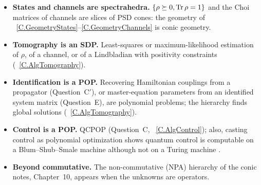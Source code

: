 \documentclass[handoutsbeamer.tex]{subfiles}
\begin{document}
\begin{frame}
\mop{\small}
\begin{itemize}\setlength\itemsep{0.4em}
    \item \textbf{States and channels are spectrahedra.} $\{\rho\succeq0,\operatorname{Tr}\rho=1\}$ and the Choi matrices of channels are slices of PSD cones: the geometry of \Chaps~\ref{C.GeometryStates}--\ref{C.GeometryChannels} is conic geometry.
    \item \textbf{Tomography is an SDP.} Least-squares or maximum-likelihood estimation of $\rho$, of a channel, or of a Lindbladian with positivity constraints (\Chap~\ref{C.AlgTomography}).
    \item \textbf{Identification is a POP.} Recovering Hamiltonian couplings from a propagator (Question~C$'$), or master-equation parameters from an identified system matrix (Question~E), are polynomial problems; the hierarchy finds global solutions (\Chap~\ref{C.AlgTomography}).
    \item \textbf{Control is a POP.} QCPOP (Question~C, \Chap~\ref{C.AlgControl}); also, casting control as polynomial optimization shows quantum control is computable on a Blum--Shub--Smale machine although not on a Turing machine \cite{bondar_uncomputability_2020}.
    \item \textbf{Beyond commutative.} The non-commutative (NPA) hierarchy of the conic notes, Chapter~10, appears when the unknowns are operators.
\end{itemize}
\end{frame}

\biblio
\end{document}
